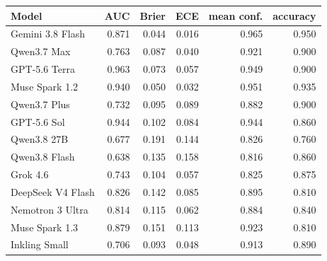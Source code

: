 \begin{tabular}{lrrrrr}
\toprule
Model & AUC & Brier & ECE & mean conf. & accuracy \\
\midrule
Gemini 3.8 Flash & 0.871 & 0.044 & 0.016 & 0.965 & 0.950 \\
Qwen3.7 Max & 0.763 & 0.087 & 0.040 & 0.921 & 0.900 \\
GPT-5.6 Terra & 0.963 & 0.073 & 0.057 & 0.949 & 0.900 \\
Muse Spark 1.2 & 0.940 & 0.050 & 0.032 & 0.951 & 0.935 \\
Qwen3.7 Plus & 0.732 & 0.095 & 0.089 & 0.882 & 0.900 \\
GPT-5.6 Sol & 0.944 & 0.102 & 0.084 & 0.944 & 0.860 \\
Qwen3.8 27B & 0.677 & 0.191 & 0.144 & 0.826 & 0.760 \\
Qwen3.8 Flash & 0.638 & 0.135 & 0.158 & 0.816 & 0.860 \\
Grok 4.6 & 0.743 & 0.104 & 0.057 & 0.825 & 0.875 \\
DeepSeek V4 Flash & 0.826 & 0.142 & 0.085 & 0.895 & 0.810 \\
Nemotron 3 Ultra & 0.814 & 0.115 & 0.062 & 0.884 & 0.840 \\
Muse Spark 1.3 & 0.879 & 0.151 & 0.113 & 0.923 & 0.810 \\
Inkling Small & 0.706 & 0.093 & 0.048 & 0.913 & 0.890 \\
\bottomrule
\end{tabular}
